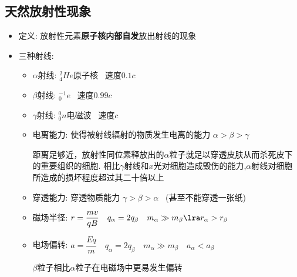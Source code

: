 \documentclass{article}
\begin{document}
\subsection{天然放射性现象}
\begin{itemize}
    \item 定义: 放射性元素\textbf{原子核内部自发}放出射线的现象 
    \item 三种射线: 
    \begin{itemize}
        \item[] $\alpha$射线: $^{2}_{4}He$原子核 \, 速度$0.1c$ 
        \item[] $\beta$射线: $^{-1}_{0}e$ \, 速度$0.99c$
        \item[] $\gamma$射线: $^{0}_{0}n$电磁波 \, 速度$c$
        \item[] 电离能力: 使得被射线辐射的物质发生电离的能力 $\alpha > \beta > \gamma$
        
        \vspace{-1em}
        \begin{adjustbox}{minipage=0.91\linewidth, bgcolor=gray!20, padding=1em}
            \small 
            距离足够近，放射性同位素释放出的$\alpha$粒子就足以穿透皮肤从而杀死皮下的重要组织的细胞.
            相比$\gamma$射线和$x$光对细胞造成毁伤的能力,$\alpha$射线对细胞所造成的损坏程度超过其二十倍以上
        \end{adjustbox}
        \vspace{-1em}

        \item[] 穿透能力: 穿透物质能力 $\gamma > \beta > \alpha$ \, (甚至不能穿透一张纸) 
        \item[] 磁场半径: $ r = \dfrac{mv}{qB} \quad q_{\alpha} = 2 q_{\beta} 
        \quad m_{\alpha} \gg m_{\beta} \lra r_{\alpha} > r_{\beta} $ 
        \item[] 电场偏转: $ a = \dfrac{Eq}{m} \quad q_{\alpha} = 2 q_{\beta} 
        \quad m_{\alpha} \gg m_{\beta} \quad a_{\alpha} < a_{\beta} $

        \vspace{-1em}
        \begin{adjustbox}{minipage=0.4\linewidth, bgcolor=gray!20, padding=1em}
            \small 
            $\beta$粒子相比$\alpha$粒子在电磁场中更易发生偏转
        \end{adjustbox}
        \vspace{-1em}
    \end{itemize}
\end{itemize}
\end{document}
